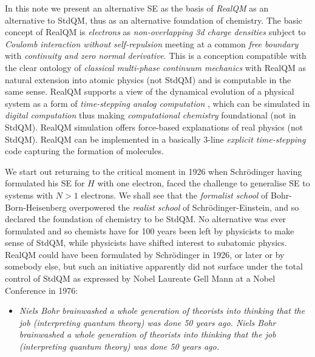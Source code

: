 \documentclass[11pt]{article} %
\begin{document}
In this note we present an alternative SE as the basis of \emph{RealQM} as an alternative to StdQM,  thus as an alternative foundation of chemistry.  The basic concept of RealQM is \emph{electrons} as \emph{non-overlapping 3d charge densities} subject to \emph{Coulomb interaction without self-repulsion} meeting at a common \emph{free boundary} with \emph{continuity and zero normal derivative}.  This is a conception compatible with the clear ontology of \emph{classical multi-phase continuum mechanics} with RealQM as natural extension into atomic physics (not StdQM) and is computable in the same sense.  RealQM supports a view of the dynamical evolution of a physical system as a form of \emph{time-stepping analog computation} \cite{wolfram},  which can be simulated in \emph{digital computation} thus making \emph{computational chemistry} foundational (not in StdQM).  RealQM simulation offers force-based explanations of real physics (not StdQM).  RealQM can be implemented in a basically 3-line \emph{explicit time-stepping} code capturing the formation of molecules.
 

We start out returning to the critical moment in 1926 when Schr\"odinger having formulated his SE for $H$ with one electron,  faced the challenge to generalise SE to systems with $N>1$ electrons.  We shall see that the \emph{formalist school} of Bohr-Born-Heisenberg overpowered the \emph{realist school} of Schr\"odinger-Einstein,  and so declared the foundation of chemistry to be StdQM.  No alternative was ever formulated and so chemists have for 100 years been left by physicists to make sense of StdQM,  while physicists have shifted interest to subatomic physics.  
RealQM could have been formulated by Schr\"odinger in 1926,  or later or by somebody else,  but such an initiative apparently did not surface under the total control of StdQM as expressed by Nobel Laureate Gell Mann at a Nobel Conference in 1976:
\begin{itemize}
\item \emph{Niels Bohr brainwashed a whole generation of theorists into thinking that the job (interpreting quantum theory) was done 50 years ago.  Niels Bohr brainwashed a whole generation of theorists into thinking that the job (interpreting quantum theory) was done 50 years ago.}
\end{itemize}
\end{document}
